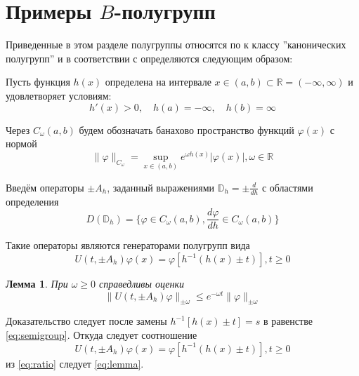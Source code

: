 \documentclass{cmfnre}
\theoremstyle{plain}
\newtheorem{lemma}{Лемма}[section]
\numberwithin{equation}{section}
\begin{document}
\section{Примеры $B$-полугрупп}

Приведенные в этом разделе полугруппы относятся по \cite{Hille} к классу ''канонических полугрупп'' и в соответствии
с \cite{Kostin} определяются следующим образом:

Пусть функция $h(x)$ определена на интервале $x \in (a, b) \subset \mathbb{R} = (-\infty, \infty)$
и удовлетворяет условиям:
\begin{equation*}
    h'(x) > 0, \quad h(a) = -\infty, \quad h(b) = \infty
\end{equation*}

Через $C_\omega (a, b)$ будем обозначать банахово пространство функций $\varphi (x)$ с нормой
\begin{equation}
    \|\varphi\|_{C_\omega} = \sup_{x \in (a, b)} e^{\omega h(x)} |\varphi(x)|, \omega \in \mathbb{R}
\end{equation}

Введём операторы $\pm A_h$, заданный выражениями $\mathbb{D}_h = \pm \frac{d}{dh}$ с областями определения
\begin{equation}
    D(\mathbb{D}_h) = \{\varphi \in C_\omega(a, b), \frac{d\varphi}{dh} \in C_\omega(a, b)\}
\end{equation}

Такие операторы являются генераторами полугрупп вида
\begin{equation}
    \label{eq:semigroup}
    U(t, \pm A_h)\varphi(x) = \varphi[h^{-1}(h(x) \pm t)], t \ge 0
\end{equation}

\begin{lemma}
    При $\omega \ge 0$ справедливы оценки
    \begin{equation}
        \label{eq:lemma}
        \|U(t, \pm A_h)\varphi\|_{\pm\omega} \le e^{-\omega t} \|\varphi\|_{\pm \omega}
    \end{equation}
\end{lemma}

Доказательство следует после замены $h^{-1}[h(x) \pm t] = s$ в равенстве \eqref{eq:semigroup}. Откуда
следует соотношение
\begin{equation}
    \label{eq:ratio}
    U(t, \pm A_h)\varphi(x) = \varphi[h^{-1}(h(x) \pm t)], t \ge 0
\end{equation}
из \eqref{eq:ratio} следует \eqref{eq:lemma}.
\end{document}
